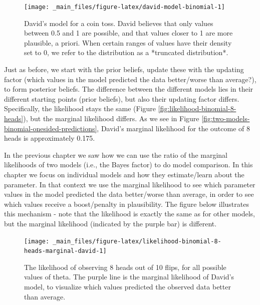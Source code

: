 \documentclass[
]{book}
\begin{document}
\begin{figure}

{\centering \texttt{[image: \_main\_files/figure-latex/david-model-binomial-1]} 

}

\caption{David's model for a coin toss. David believes that only values between 0.5 and 1 are possible, and that values closer to 1 are more plausible, a priori. When certain ranges of values have their density set to 0, we refer to the distribution as a *truncated distribution*.}\label{fig:david-model-binomial}
\end{figure}

Just as before, we start with the prior beliefs, update these with the updating factor (which values in the model predicted the data better/worse than average?), to form posterior beliefs. The difference between the different models lies in their different starting points (prior beliefs), but also their updating factor differs. Specifically, the likelihood stays the same (Figure \ref{fig:likelihood-binomial-8-heads}), but the marginal likelihood differs. As we see in Figure \ref{fig:two-models-binomial-onesided-predictions}, David's marginal likelihood for the outcome of 8 heads is approximately 0.175.

In the previous chapter we saw how we can use the ratio of the marginal likelihoods of two models (i.e., the Bayes factor) to do model comparison. In this chapter we focus on individual models and how they estimate/learn about the parameter. In that context we use the marginal likelihood to see which parameter values in the model predicted the data better/worse than average, in order to see which values receive a boost/penalty in plausibility. The figure below illustrates this mechanism - note that the likelihood is exactly the same as for other models, but the marginal likelihood (indicated by the purple bar) is different.

\begin{figure}

{\centering \texttt{[image: \_main\_files/figure-latex/likelihood-binomial-8-heads-marginal-david-1]} 

}

\caption{The likelihood of observing 8 heads out of 10 flips, for all possible values of theta. The purple line is the marginal likelihood of David's model, to visualize which values predicted the observed data better than average.}\label{fig:likelihood-binomial-8-heads-marginal-david}
\end{figure}
\end{document}
